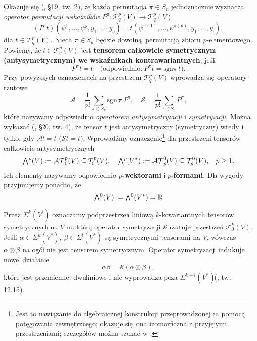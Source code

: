 Okazuje się (\cite{herdegen}, §19, tw. 2), że każda permutacja \(\pi\in S_n\) jednoznacznie wyznacza \emph{operator permutacji wskaźników} \(P^{\pi}:\mathcal{T}_q^p(V)\to\mathcal{T}_q^p(V)\)
\begin{equation*}
    (P^\pi t)(\psi^1, \dots, \psi^p, y_1, \dots, y_q) = t(\psi^{\pi(1)}, \dots, \psi^{\pi(p)}, y_1, \dots, y_q),
\end{equation*} dla \(t\in\mathcal{T}_q^p(V)\). Niech \(\pi\in S_p\) będzie dowolną permutacją zbioru \(p\)-elementowego. Powiemy, że \(t\in\mathcal{T}_q^p(V)\) jest \textbf{tensorem całkowicie symetrycznym (antysymetrycznym) we wskaźnikach kontrawariantnych}, jeśli
\begin{equation*}
    P^\pi t = t\quad \text{(odpowiednio:}\ P^{\pi} t = \mathrm{sgn}\pi\, t\text{)}.
\end{equation*}
Przy powyższych oznaczeniach na przestrzeni \(\mathcal{T}_q^p(V)\) wprowadza się operatory rzutowe
\begin{equation*}
    \mathcal{A}=\frac{1}{p!}\sum_{\pi\in S_p} \mathrm{sgn\,\pi}\,P^\pi,\quad \mathcal{S}=\frac{1}{p!}\sum_{\pi\in S_p} P^\pi,
\end{equation*}
które nazywamy odpowiednio \emph{operatorem antysymetryzacji} i \emph{symetryzacji}. Można wykazać (\cite{herdegen}, §20, tw. 4), że tensor \(t\) jest antysymetryczny (symetryczny) wtedy i tylko, gdy \(\mathcal{A}t = t\)  (\(\mathcal{S}t = t\)). Wprowadźmy oznaczenie\footnote{Jest to nawiązanie do algebraicznej konstrukcji przeprowadzonej za pomocą potęgowania zewnętrznego; okazuje się ona izomorficzna z przyjętymi przestrzeniami; szczegółów można szukać w \cite{maurin2}.} dla przestrzeni tensorów całkowicie antysymetrycznych
\begin{align*}
    \Exterior^p(V):=\mathcal{AT}^p_0(V)\subseteq \mathcal{T}^p_0(V),\quad \Exterior^p(V^\ast):=\mathcal{AT}^0_p(V)\subseteq\mathcal{T}^0_p(V), \quad p\geq 1.
\end{align*}
Ich elementy nazywamy odpowiednio \textbf{\(p\)-wektorami} i \textbf{\(p\)-formami}. Dla wygody przyjmujemy ponadto, że
\begin{equation*}
     \Exterior^0(V):=\Exterior^0(V^\ast)=\R
\end{equation*}

Przez \(\Sigma^k(V^{\ast})\) oznaczamy podprzestrzeń liniową \(k\)-kowariantnych tensorów symetrycznych na \(V\) na którą operator symetryzacji \(\mathcal{S}\) rzutuje przestrzeń \(\mathcal{T}^k_0(V)\). Jeśli \(\alpha\in\Sigma^k(V^{\ast})\), \(\beta\in\Sigma^l(V^{\ast})\) są symetrycznymi tensorami na \(V\), wówczas \(\alpha\otimes\beta\) na ogół nie jest tensorem symetrycznym. Operator symetryzacji indukuje nowe działanie
\begin{equation*}
    \alpha\beta = \mathcal{S}(\alpha\otimes\beta),
\end{equation*}
które jest przemienne, dwuliniowe i nie wyprowadza poza \(\Sigma^{k+l}(V^{\ast})\)(\cite{lee}, tw. 12.15).

